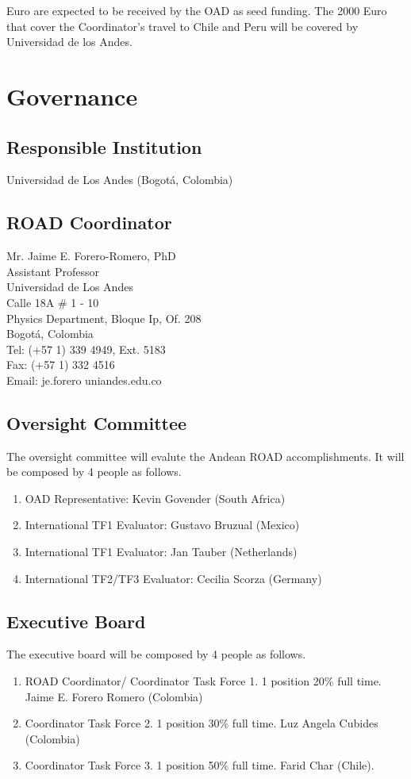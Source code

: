 \documentclass[12pt]{article}
\begin{document}
 Euro are expected to be received by the OAD as seed funding. The
2000 Euro that cover the Coordinator’s travel to Chile and Peru will
be covered by Universidad de los Andes. 

\section{Governance}

\subsection*{Responsible Institution}
\noindent
Universidad de Los Andes (Bogotá, Colombia)

\subsection*{ROAD Coordinator}
\noindent
Mr. Jaime E. Forero-Romero, PhD\\
Assistant Professor\\
Universidad de Los Andes\\
Calle 18A \# 1 - 10\\
Physics Department, Bloque Ip, Of. 208\\
Bogot\'a, Colombia\\
Tel:  (+57 1) 339 4949, Ext. 5183\\
Fax: (+57 1) 332 4516 \\
Email: je.forero uniandes.edu.co\\

\subsection*{Oversight Committee}

The oversight committee will evalute the Andean ROAD
accomplishments. It will be composed by 4 people as follows.
\begin{enumerate}
\item OAD Representative: Kevin Govender (South Africa)
\item International TF1 Evaluator: Gustavo Bruzual (Mexico)
\item International TF1 Evaluator: Jan Tauber (Netherlands)
\item International TF2/TF3 Evaluator: Cecilia Scorza (Germany)
\end{enumerate}
\subsection*{Executive Board}
\noindent
The executive board will be composed by 4 people as follows.
\begin{enumerate}
\item ROAD Coordinator/ Coordinator Task Force 1. 1 position 20\% full
  time. Jaime E. Forero Romero (Colombia) 
\item Coordinator Task Force 2. 1 position 30\% full time. Luz Angela
  Cubides (Colombia) 
\item Coordinator Task Force 3. 1 position 50\% full time. Farid Char
  (Chile). 
\end{enumerate}
\end{document}
